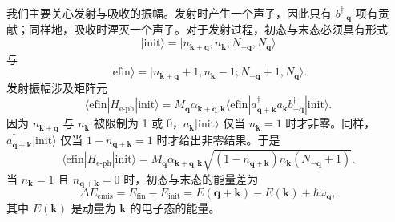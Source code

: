 我们主要关心发射与吸收的振幅。发射时产生一个声子，因此只有 $b_{-\mathbf{q}}^{\dagger}$ 项有贡献；同样地，吸收时湮灭一个声子。对于发射过程，初态与末态必须具有形式
\begin{equation*}
|\mathrm{init}\rangle=|n_{\mathbf{k}+\mathbf{q}},n_{\mathbf{k}};N_{-\mathbf{q}},N_{\mathbf{q}}\rangle\tag{11.39}
\end{equation*}
与
\begin{equation*}
|\mathrm{efin}\rangle=|n_{\mathbf{k}+\mathbf{q}}+1,n_{\mathbf{k}}-1;N_{-\mathbf{q}}+1,N_{\mathbf{q}}\rangle.\tag{11.40}
\end{equation*}
发射振幅涉及矩阵元
\begin{equation*}
\langle\mathrm{efin}|H_{\text{e-ph}}|\mathrm{init}\rangle=M_{\mathbf{q}}\alpha_{\mathbf{k}+\mathbf{q},\mathbf{k}}\langle\mathrm{efin}|a_{\mathbf{q}+\mathbf{k}}^{\dagger}a_{\mathbf{k}}b_{-\mathbf{q}}^{\dagger}|\mathrm{init}\rangle.\tag{11.41}
\end{equation*}
因为 $n_{\mathbf{k}+\mathbf{q}}$ 与 $n_{\mathbf{k}}$ 被限制为 1 或 0，$a_{\mathbf{k}}|\mathrm{init}\rangle$ 仅当 $n_{\mathbf{k}}=1$ 时才非零。同样，$a_{\mathbf{q}+\mathbf{k}}^{\dagger}|\mathrm{init}\rangle$ 仅当 $1-n_{\mathbf{q}+\mathbf{k}}=1$ 时才给出非零结果。于是
\begin{equation*}
\langle\mathrm{efin}|H_{\text{e-ph}}|\mathrm{init}\rangle=M_{\mathbf{q}}\alpha_{\mathbf{k}+\mathbf{q},\mathbf{k}}\sqrt{(1-n_{\mathbf{q}+\mathbf{k}})n_{\mathbf{k}}(N_{-\mathbf{q}}+1)}.\tag{11.42}
\end{equation*}
当 $n_{\mathbf{k}}=1$ 且 $n_{\mathbf{q}+\mathbf{k}}=0$ 时，初态与末态的能量差为
\begin{equation*}
\Delta E_{\mathrm{emis}}=E_{\mathrm{fin}}-E_{\mathrm{init}}=E(\mathbf{q}+\mathbf{k})-E(\mathbf{k})+\hbar\omega_{\mathbf{q}},\tag{11.43}
\end{equation*}
其中 $E(\mathbf{k})$ 是动量为 $\mathbf{k}$ 的电子态的能量。

